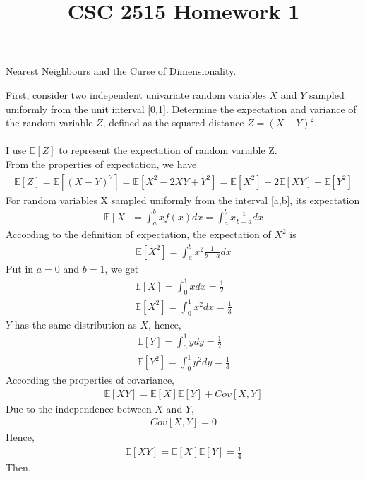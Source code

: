 \documentclass{myhw}
\title{CSC 2515 Homework 1}
\begin{document}
\begin{homeworkProblem}
Nearest Neighbours and the Curse of Dimensionality.
\begin{homeworkSection}
First, consider two independent univariate random variables $X$ and $Y$ sampled uniformly from the unit interval [0,1]. Determine the expectation and variance of the random variable $Z$, defined as the squared distance $Z=(X-Y)^2$. \\
\\
I use $\mathbb{E}[Z]$ to represent the expectation of random variable Z. \\
From the properties of expectation, we have 
\begin{gather*}
\mathbb{E}[Z] = \mathbb{E}[(X-Y)^2] = \mathbb{E}[X^2-2XY+Y^2] = \mathbb{E}[X^2] - 2\mathbb{E}[XY] + \mathbb{E}[Y^2]
\end{gather*}
For random variables X sampled uniformly from the interval [a,b], its expectation 
\begin{gather*}
\mathbb{E}[X] = \int_{a}^{b}{xf(x)dx} = \int_{a}^{b}{x\frac{1}{b-a}dx}
\end{gather*}
According to the definition of expectation, the expectation of $X^2$ is 
\begin{gather*}
\mathbb{E}[X^2]=\int_{a}^{b}{x^2\frac{1}{b-a}dx}
\end{gather*}
Put in $a=0$ and $b=1$, we get
\begin{gather*}
\mathbb{E}[X] = \int_{0}^{1}{xdx} = \frac{1}{2} \\
\mathbb{E}[X^2]=\int_{0}^{1}{x^2dx}=\frac{1}{3}
\end{gather*}
$Y$ has the same distribution as $X$, hence, 
\begin{gather*}
\mathbb{E}[Y] = \int_{0}^{1}{ydy} = \frac{1}{2} \\
\mathbb{E}[Y^2]=\int_{0}^{1}{y^2dy}=\frac{1}{3}
\end{gather*}
According the properties of covariance, 
\begin{gather*}
\mathbb{E}[XY] = \mathbb{E}[X]\mathbb{E}[Y]+Cov[X, Y]
\end{gather*}
Due to the independence between $X$ and $Y$, 
\begin{gather*}
Cov[X, Y] = 0
\end{gather*}
Hence, 
\begin{gather*}
\mathbb{E}[XY] = \mathbb{E}[X]\mathbb{E}[Y] = \frac{1}{4}
\end{gather*}
Then, 
\begin{gather*}

\end{gather*}
\end{homeworkSection}
\end{homeworkProblem}
\end{document}
